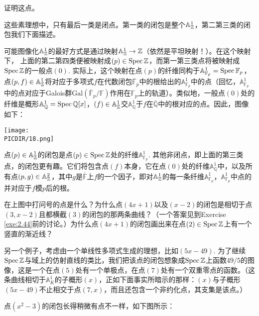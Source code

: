 \begin{exe}
	证明这点。
\end{exe}

这些素理想中，只有最后一类是闭点。第一类的闭包是整个$\mathbb{A}_{\mathbb{Z}}^1$，第二第三类的闭包我们下面描述。

可能图像化$\mathbb{A}_{\mathbb{Z}}^1$的最好方式是通过映射$\mathbb{A}_{\mathbb{Z}}^1\to\mathbb{Z}$（依然是平坦映射！）。在这个映射下， 上面的第二第四类便被映射成$(p)\in\operatorname{Spec} \mathbb{Z}$，而第一第三类点将被映射成$\operatorname{Spec} \mathbb{Z}$的一般点$(0)$. 实际上，这个映射在点$(p)$的纤维同构于$\mathbb{A}_{\mathbb{F}_p}^1=\operatorname{Spec} \mathbb{F}_p$，点$(p,f)\in\mathbb{A}_{\mathbb{Z}}^1$将对应于多项式$f$在代数闭包$\bar{\mathbb{F}}_p$中的根给出的$\mathbb{A}_{\mathbb{F}_p}^1$中的点（回忆，$\mathbb{A}_{\mathbb{F}_p}^1$中的点对应于Galois群$\mathrm{Gal}\left(\bar{\mathbb{F}}_p/\mathbb{F}\right)$作用在$\mathbb{F}_p$上的轨道）。类似地，一般点$(0)$处的纤维是概形$\mathbb{A}_\mathbb{Q}^1=\operatorname{Spec} \mathbb{Q}[x]$，$(f)\in\mathbb{A}_{\mathbb{Z}}^1$交$\mathbb{A}_\mathbb{Q}^1$于$f$在$\bar{\mathbb{Q}}$中的根对应的点。因此，图像如下：

\begin{center}\texttt{[image: \\PICDIR/18.png]}\end{center}
\label{p:2.18}

点$(p)\in\mathbb{A}_{\mathbb{Z}}^1$的闭包是点$(p)\in \operatorname{Spec} \mathbb{Z}$处的纤维$\mathbb{A}_{\mathbb{F}_p}^1$. 其他非闭点，即上面的第三类点，的闭包更有趣。它们将包含点$(f)$本身，它在点$(0)$处的纤维$\mathbb{A}_\mathbb{Q}^1$中，以及所有点$(p,g)\in\mathbb{A}_{\mathbb{Z}}^2$，其中$g$是$\bar{\mathbb{F}}$上$f$的一个因子，即对$\mathbb{A}_{\mathbb{Z}}^1$的每一条纤维$\mathbb{A}_{\mathbb{F}_p}^1$，$\mathbb{A}_{\mathbb{F}_p}^1$中点的并对应于$f$模$p$后的根。

\begin{exe}
	在上图中打问号的点是什么？为什么点$(4x+1)$以及$(x-2)$的闭包是相切于点$(3,x-2)$且都横截$(3)$的闭包的那两条曲线？（一个答案见到Exercise \ref{exe:2.44}前的讨论。）为什么点$(4x+1)$的闭包画出来在点$(2)\in\operatorname{Spec} \mathbb{Z}$上有一个竖直的渐近线？
\end{exe}

另一个例子，考虑由一个单线性多项式生成的理想，比如$(5x-49)$. 为了继续$\operatorname{Spec} \mathbb{Z}$与域上的仿射直线的类比，我们把该点的闭包想象成$\operatorname{Spec}\mathbb{Z}$上函数$49/5$的图像，这是一个在点$(5)$处有一个单极点，在点$(7)$处有一个双重零点的函数。（这条曲线相切于$\mathbb{A}_K^1$的子概形$(x)$，正如下面事实所暗示的那样：$(x)$与子概形$(5x-49)$不止相交于点$(7,x)$，而且还包含一个非约化点，其支集是该点。）

点$(x^2-3)$的闭包长得稍微有点不一样，如下图所示：

